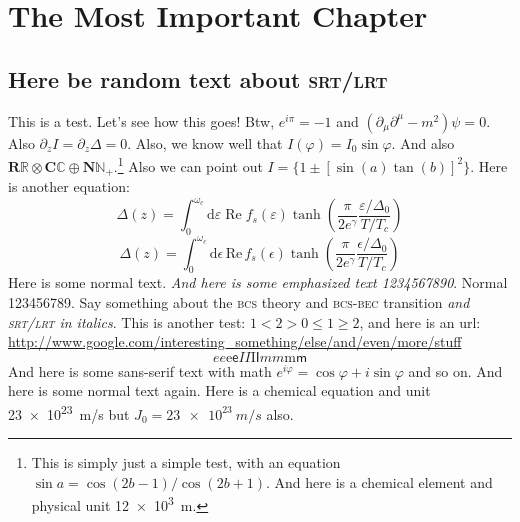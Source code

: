 \chapter{The Most Important Chapter}
\section{Here be random text about \textsc{srt/lrt}}
This is a test. Let's see how this goes! Btw, $e^{i\pi} = -1$ and $(\partial_\mu \partial^\mu - m^2) \psi = 0$.
Also $\partial_z I = \partial_z \Delta = 0$.
Also, we know well that $I(\varphi) = I_0 \sin \varphi$.  And also $\mathbf{R}\mathbb{R} \otimes \mathbf{C}\mathbb{C} \oplus \mathbf{N}\mathbb{N}_+$.\footnote{This is simply just a simple test, with an equation $\sin a = \cos(2b-1)/\cos(2b+1)$. And here is a chemical element  and physical unit \SI{12e3}{m}. }
Also we can point out $I = \{ 1 \pm [\sin(a)\tan(b)]^2\} $.
Here is another equation:
\begin{equation}
  Δ(z) = \int_0^{ω_c} \mathrm{d}ε\;\mathrm{Re}\; f_s(ε) \tanh\!\left(\frac{π}{2e^γ} \frac{ε/Δ_0}{T/T_c}\right)
\end{equation}
\begin{equation}
  \Delta(z) = \int_0^{\omega_c} \mathrm{d}\epsilon\,\mathrm{Re}\, f_s(\epsilon) \tanh\!\left(\frac{\pi}{2e^\gamma} \frac{\epsilon/\Delta_0}{T/T_c}\right)
\end{equation}
Here is some normal text. \textit{And here is some emphasized text 1234567890}. Normal 123456789. 
Say something about the \textsc{bcs} theory and \textsc{bcs-bec} transition \emph{and \textsc{srt/lrt} in italics}.
This is another test: $1 < 2 > 0 \leq 1 \geq 2$, and here is an url: \url{http://www.google.com/interesting_something/else/and/even/more/stuff}
\begin{equation}
  \textit{e}e\mathrm{e}\textsf{e}%
  \textit{I}I\mathrm{I}\textsf{I}%
  \textit{m}m\mathrm{m}\textsf{m}%
\end{equation}
\textsf{And here is some sans-serif text with math $e^{i\varphi}=\cos\varphi+i\sin\varphi$ and so on.} And here is some normal text again.
Here is a chemical equation  and unit \SI{23e23}{m/s} but $J_0 = \SI{23e23}{m/s}$ also.

